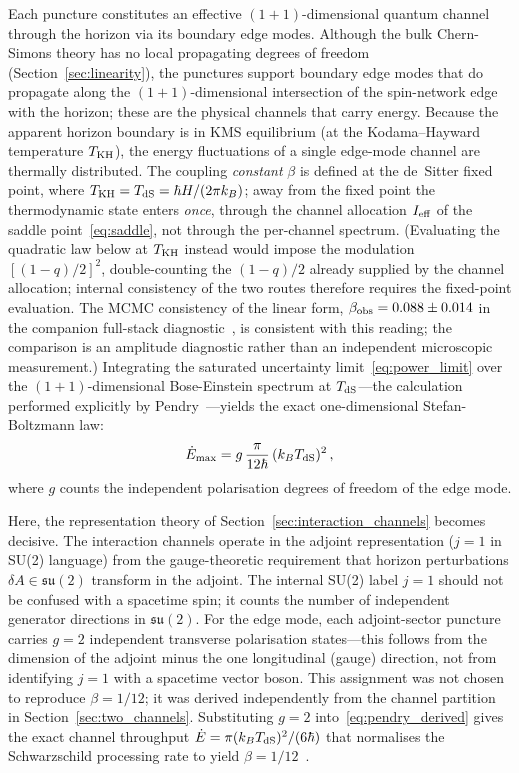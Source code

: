 \documentclass[aps,prd,twocolumn,10pt,superscriptaddress,nofootinbib]{revtex4-2}
\begin{document}
Each puncture constitutes an effective $(1{+}1)$-dimensional
quantum channel through the horizon via its boundary edge modes.
Although the bulk Chern-Simons theory has no local propagating
degrees of freedom (Section~\ref{sec:linearity}), the
punctures support boundary edge modes that do propagate along
the $(1{+}1)$-dimensional intersection of the spin-network edge
with the horizon; these are the physical channels that carry
energy.  Because the apparent horizon boundary is in KMS
equilibrium (at the Kodama--Hayward temperature $T_{\rm KH}$),
the energy fluctuations of a single edge-mode channel are
thermally distributed.  The coupling \emph{constant} $\beta$ is
defined at the de~Sitter fixed point, where
$T_{\rm KH} = T_{\rm dS} = \hbar H/(2\pi k_B)$; away from the
fixed point the thermodynamic state enters \emph{once}, through
the channel allocation $I_{\rm eff}$ of the saddle
point~\eqref{eq:saddle}, not through the per-channel spectrum.
(Evaluating the quadratic law below at $T_{\rm KH}$ instead would
impose the modulation $[(1-q)/2]^2$, double-counting the
$(1-q)/2$ already supplied by the channel allocation; internal
consistency of the two routes therefore requires the fixed-point
evaluation.  The MCMC consistency of the linear form,
$\beta_{\rm obs} = 0.088 \pm 0.014$ in the companion
full-stack diagnostic~\cite{Sayegh2026}, is consistent with this reading;
the comparison is an amplitude diagnostic rather than an independent
microscopic measurement.)  Integrating the
saturated uncertainty limit~\eqref{eq:power_limit} over the
$(1{+}1)$-dimensional Bose-Einstein spectrum at $T_{\rm dS}$---the
calculation performed explicitly by Pendry~\cite{Pendry1983}---yields
the exact one-dimensional Stefan-Boltzmann law:
\begin{equation}
\dot{E}_{\rm max}
  = g\,\frac{\pi}{12\hbar}\,(k_B T_{\rm dS})^2\,,
\label{eq:pendry_derived}
\end{equation}
where $g$ counts the independent polarisation degrees of freedom
of the edge mode.

Here, the representation theory of
Section~\ref{sec:interaction_channels} becomes decisive.  The
interaction channels operate in the adjoint
representation ($j = 1$ in SU(2) language) from the gauge-theoretic
requirement that horizon perturbations $\delta A \in
\mathfrak{su}(2)$ transform in the adjoint.  The internal
SU(2) label $j = 1$ should not be confused with a spacetime
spin; it counts the number of independent generator directions
in $\mathfrak{su}(2)$.  For the edge mode, each adjoint-sector
puncture carries $g = 2$ independent transverse polarisation
states---this follows from the dimension of the adjoint minus
the one longitudinal (gauge) direction, not from identifying
$j = 1$ with a spacetime vector boson.  This assignment was not
chosen to reproduce $\beta = 1/12$; it was derived independently
from the channel partition in Section~\ref{sec:two_channels}.
Substituting $g = 2$ into~\eqref{eq:pendry_derived} gives the
exact channel throughput $\dot{E} = \pi(k_B T_{\rm dS})^2/(6\hbar)$ that
normalises the Schwarzschild processing rate to yield
$\beta = 1/12$~\cite{Sayegh2026}.
\end{document}
